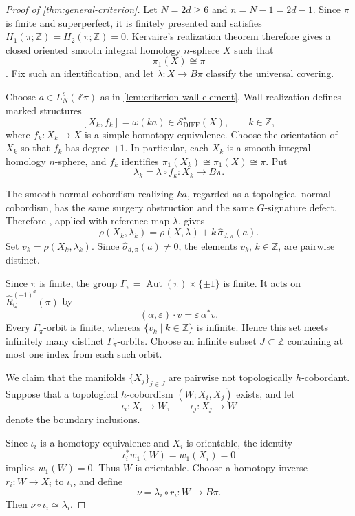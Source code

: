 \documentclass[10pt,reqno]{amsart}
\numberwithin{equation}{section}
\theoremstyle{definition}
\theoremstyle{remark}
\newcommand{\Z}{\mathbb Z}
\newcommand{\Q}{\mathbb Q}
\newcommand{\DIFF}{\mathrm{DIFF}}
\newcommand{\cS}{\mathcal S}
\newcommand{\Aut}{\operatorname{Aut}}
\begin{document}
\begin{proof}[Proof of \cref{thm:general-criterion}]
Let \(N=2d\geq6\) and \(n=N-1=2d-1\).  Since \(\pi\) is finite and
superperfect, it is finitely presented and satisfies
\(H_1(\pi;\Z)=H_2(\pi;\Z)=0\).  Kervaire's realization theorem
therefore gives a closed oriented smooth integral homology
\(n\)-sphere \(X\) such that
\[
\pi_1(X)\cong\pi
\]
\cite[Theorem~1]{KervaireHomologySpheres}.  Fix such an identification,
and let \(\lambda\colon X\to B\pi\) classify the universal covering.

Choose \(a\in L_N^s(\Z\pi)\) as in
\cref{lem:criterion-wall-element}.  Wall realization defines marked
structures
\[
[X_k,f_k]
=
\omega(ka)
\in
\cS^s_{\DIFF}(X),
\qquad
k\in\Z,
\]
where \(f_k\colon X_k\to X\) is a simple homotopy equivalence.
Choose the orientation of \(X_k\) so that \(f_k\) has degree \(+1\).
In particular, each \(X_k\) is a smooth integral homology \(n\)-sphere,
and \(f_k\) identifies
\(\pi_1(X_k)\cong\pi_1(X)\cong\pi\).  Put
\[
\lambda_k=\lambda\circ f_k\colon X_k\longrightarrow B\pi.
\]

The smooth normal cobordism realizing \(ka\), regarded as a
topological normal cobordism, has the same surgery obstruction and
the same \(G\)-signature defect.  Therefore
\cite[Equation~(1.2) and Remark~1.7]{CrowleyMacko}, applied with
reference map \(\lambda\), gives
\begin{equation}\label{eq:criterion-rho-sequence}
\rho(X_k,\lambda_k)
=
\rho(X,\lambda)
+
k\,\widehat\sigma_{d,\pi}(a).
\end{equation}
Set \(v_k=\rho(X_k,\lambda_k)\).  Since
\(\widehat\sigma_{d,\pi}(a)\neq0\), the elements \(v_k\), \(k\in\Z\),
are pairwise distinct.

Since \(\pi\) is finite, the group
\(\Gamma_\pi=\Aut(\pi)\times\{\pm1\}\) is finite.  It acts on
\(\widehat R^{(-1)^d}_{\Q}(\pi)\) by
\[
(\alpha,\varepsilon)\cdot v
=
\varepsilon\,\alpha^*v.
\]
Every \(\Gamma_\pi\)-orbit is finite, whereas
\(\{v_k\mid k\in\Z\}\) is infinite.  Hence this set meets infinitely
many distinct \(\Gamma_\pi\)-orbits.  Choose an infinite subset
\(J\subset\Z\) containing at most one index from each such orbit.

We claim that the manifolds \(\{X_j\}_{j\in J}\) are pairwise not
topologically \(h\)-cobordant.  Suppose that a topological
\(h\)-cobordism \((W;X_i,X_j)\) exists, and let
\[
\iota_i\colon X_i\longrightarrow W,
\qquad
\iota_j\colon X_j\longrightarrow W
\]
denote the boundary inclusions.

Since \(\iota_i\) is a homotopy equivalence and \(X_i\) is orientable,
the identity
\[
\iota_i^*w_1(W)=w_1(X_i)=0
\]
implies \(w_1(W)=0\).  Thus \(W\) is orientable.  Choose a homotopy
inverse \(r_i\colon W\to X_i\) to \(\iota_i\), and define
\[
\nu=\lambda_i\circ r_i\colon W\longrightarrow B\pi.
\]
Then \(\nu\circ\iota_i\simeq\lambda_i\).


\end{proof}
\end{document}
